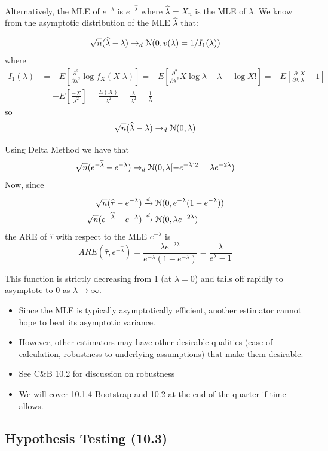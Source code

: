 \documentclass[11pt,]{article}
\def\lambdahat{{\widehat\lambda}}
\def\tauhat{{\widehat\tau}}
\def\Xbar{\bar{ X}}
\def\Nsc{{\cal N}}
\begin{document}
Alternatively, the MLE of \(e^{-\lambda}\) is \(e^{-\lambdahat}\) where
\(\lambdahat = \Xbar_n\) is the MLE of \(\lambda\). We know from the
asymptotic distribution of the MLE \(\lambdahat\) that:

\[\sqrt{n}(\lambdahat - \lambda) \to_d \Nsc(0, v(\lambda) = 1/I_1(\lambda))\]
where \begin{align*}
I_1(\lambda) &= -E\left[\frac{\partial^2}{\partial \lambda^2}\log f_X(X|\lambda)\right] =
-E\left[\frac{\partial^2}{\partial \lambda^2}X \log\lambda - \lambda - \log X!\right]=
-E\left[\frac{\partial}{\partial \lambda}\frac{X}{\lambda} - 1\right] \\
&=
-E\left[\frac{-X}{\lambda^2}\right] = \frac{E(X)}{\lambda^2} =\frac{\lambda}{\lambda^2} = \frac{1}{\lambda}
\end{align*} so
\[\sqrt{n}(\lambdahat - \lambda) \to_d \Nsc(0, \lambda)\]

Using Delta Method we have that
\[\sqrt{n}(e^{-\lambdahat} - e^{-\lambda}) \to_d \Nsc(0, \lambda [-e^{-\lambda}]^2 = \lambda e^{-2\lambda})\]
Now, since \begin{align*}
\sqrt{n}(\tauhat - e^{-\lambda}) &\xrightarrow{d} \Nsc(0, e^{-\lambda}(1-e^{-\lambda}))\\
\sqrt{n}(e^{-\lambdahat}-e^{-\lambda}) &\xrightarrow{d}  \Nsc(0, \lambda e^{-2\lambda})
\end{align*} the ARE of \(\tauhat\) with respect to the MLE
\(e^{-\lambdahat}\) is
\[ARE(\tauhat,e^{-\lambdahat}) = \frac{\lambda e^{-2\lambda}}{e^{-\lambda}(1-e^{-\lambda})} = \frac{\lambda}{e^{\lambda} - 1}\]

This function is strictly decreasing from 1 (at \(\lambda = 0\)) and
tails off rapidly to asymptote to 0 as \(\lambda \to \infty\).

\begin{itemize}
\item Since the MLE is typically asymptotically efficient, another estimator cannot hope to beat its asymptotic variance.
\item However, other estimators may have other desirable qualities (ease of calculation, robustness to underlying assumptions) that make them desirable.
\item See C\&B 10.2 for discussion on robustness
\item We will cover 10.1.4 Bootstrap and 10.2 at the end of the quarter if time allows.
\end{itemize}
\newpage

\subsection{Hypothesis Testing (10.3)}
\end{document}
